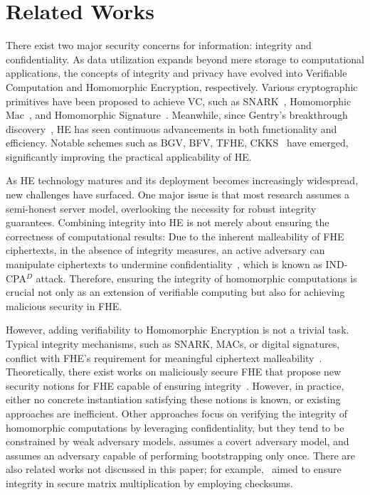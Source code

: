 \section{Related Works}
There exist two major security concerns for information: integrity and confidentiality. As data utilization expands beyond mere storage to computational applications, the concepts of integrity and privacy have evolved into Verifiable Computation and Homomorphic Encryption, respectively.
    Various cryptographic primitives have been proposed to achieve VC, such as SNARK~\cite{SoK}, Homomorphic Mac~\cite{HomMAc1, Hommac2}, and Homomorphic Signature~\cite{HomomorphicSignautre}. Meanwhile, since Gentry's breakthrough discovery~\cite{Gen09}, HE has seen continuous advancements in both functionality and efficiency. Notable schemes such as BGV, BFV, TFHE, CKKS~\cite{BGV,bfv,CGGI,CKKS} have emerged, significantly improving the practical applicability of HE. 
    
    As HE technology matures and its deployment becomes increasingly widespread, new challenges have surfaced. One major issue is that most research assumes a semi-honest server model, overlooking the necessity for robust integrity guarantees.
    Combining integrity into HE is not merely about ensuring the correctness of computational results: Due to the inherent malleability of FHE ciphertexts, in the absence of integrity measures, an active adversary can manipulate ciphertexts to undermine confidentiality~\cite{INDCPAD, INDCPAD1}, which is known as IND-CPA$^D$ attack. Therefore, ensuring the integrity of homomorphic computations is crucial not only as an extension of verifiable computing but also for achieving malicious security in FHE.

    However, adding verifiability to Homomorphic Encryption is not a trivial task.  
    Typical integrity mechanisms, such as SNARK, MACs, or digital signatures, conflict with FHE’s requirement for meaningful ciphertext malleability~\cite{SnarkVHE, Flexible, Efficiently, BoostingVCE, Rinocchio}. Theoretically, there exist works on maliciously secure FHE that propose new security notions for FHE capable of ensuring integrity~\cite{Beyond_IND-CCA1_Security, Targeted_Malleability}.  
    However, in practice, either no concrete instantiation satisfying these notions is known, or existing approaches are inefficient.
    Other approaches focus on verifying the integrity of homomorphic computations by leveraging confidentiality, but they tend to be constrained by weak adversary models. \cite{VE} assumes a covert adversary model, and~\cite{cryptoeprint:PRF} assumes an adversary capable of performing bootstrapping only once. There are also related works not discussed in this paper; for example,~\cite{DataSeal} aimed to ensure integrity in secure matrix multiplication by employing checksums.
    
